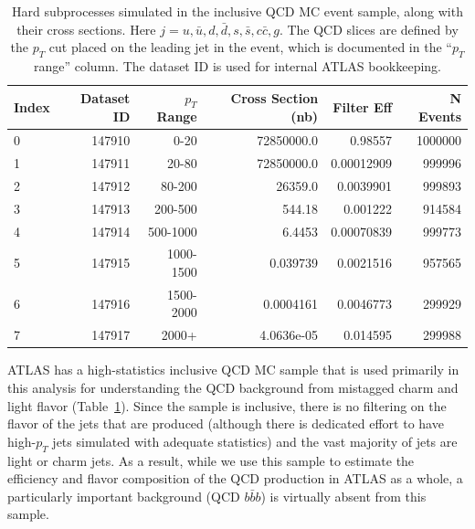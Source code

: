 \begin{table}[h]
 \begin{center}
\caption{Hard subprocesses simulated in the inclusive QCD MC event sample, along with their cross sections. Here
$j=u,\bar{u},d,\bar{d},s,\bar{s},c\bar{c},g$.  The QCD slices are defined by the $p_T$ cut placed
on the leading jet in the event, which is documented in the ``$p_T$ range'' column.  The dataset
ID is used for internal ATLAS bookkeeping.
\label{tab:qcd_mc_parameters}}
    \begin{tabular}{l r r r r r} \hline \hline
    Index & Dataset ID & $p_T$ Range& Cross Section (nb)& Filter Eff   & N Events \\ \hline
    0     &  147910    & 0-20        &  72850000.0       &      0.98557 & 1000000 \\
    1     &  147911    & 20-80       &  72850000.0       &   0.00012909 & 999996  \\
    2     &  147912    & 80-200      &     26359.0       &    0.0039901 & 999893 \\
    3     &  147913    & 200-500     &      544.18       &     0.001222 & 914584 \\
    4     &  147914    & 500-1000    &      6.4453       &   0.00070839 & 999773 \\
    5     &  147915    & 1000-1500   &    0.039739       &    0.0021516 & 957565 \\
    6     &  147916    & 1500-2000   &   0.0004161       &    0.0046773 & 299929 \\
    7     &  147917    & 2000+       &  4.0636e-05       &     0.014595 & 299988 \\ \hline
    \end{tabular}
  \end{center}
\end{table}

ATLAS has a high-statistics inclusive QCD MC sample that is used primarily in 
this analysis for understanding the QCD background from 
mistagged charm and light flavor (Table~\ref{tab:qcd_mc_parameters}).  Since 
the sample is inclusive, there is no filtering on the flavor of the jets 
that are produced (although there is dedicated effort to have high-$p_T$ 
jets simulated with adequate statistics) and the vast majority of jets are light or 
charm jets.  As a result, while we use this sample to estimate the 
efficiency and flavor composition of the QCD production in ATLAS as a whole, a 
particularly important background (QCD $b\bar{b}b$) is virtually absent from this sample.


